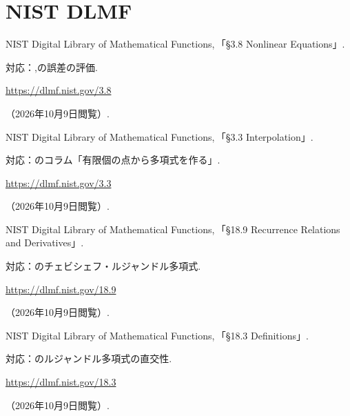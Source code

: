   \section{NIST DLMF}
  \begin{enumerate}[resume,label={[\arabic*]}]
    \item \begin{minipage}[t]{\linewidth}\raggedright
        NIST Digital Library of Mathematical Functions,\,「§3.8 Nonlinear Equations」.
        \par{\small 対応：,の誤差の評価.\par}
        \par\noindent\url{https://dlmf.nist.gov/3.8}\par
        \noindent（2026年10月9日閲覧）.
      \end{minipage}\par\smallskip

    \item \begin{minipage}[t]{\linewidth}\raggedright
        NIST Digital Library of Mathematical Functions,\,「§3.3 Interpolation」.
        \par{\small 対応：のコラム「有限個の点から多項式を作る」.\par}
        \par\noindent\url{https://dlmf.nist.gov/3.3}\par
        \noindent（2026年10月9日閲覧）.
      \end{minipage}\par\smallskip

    \item \begin{minipage}[t]{\linewidth}\raggedright
        NIST Digital Library of Mathematical Functions,\,「§18.9 Recurrence Relations and Derivatives」.
        \par{\small 対応：のチェビシェフ・ルジャンドル多項式.\par}
        \par\noindent\url{https://dlmf.nist.gov/18.9}\par
        \noindent（2026年10月9日閲覧）.
      \end{minipage}\par\smallskip

    \item \begin{minipage}[t]{\linewidth}\raggedright
        NIST Digital Library of Mathematical Functions,\,「§18.3 Definitions」.
        \par{\small 対応：のルジャンドル多項式の直交性.\par}
        \par\noindent\url{https://dlmf.nist.gov/18.3}\par
        \noindent（2026年10月9日閲覧）.
      \end{minipage}\par\smallskip


\end{enumerate}
